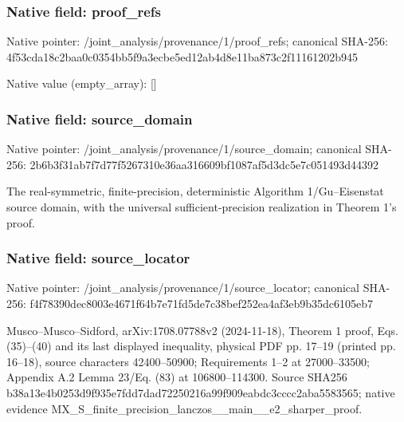 \documentclass[10pt,a4paper]{article}
\begin{document}
\subsubsection{Native field: proof\_\allowbreak{}refs}
Native pointer: /joint\_\allowbreak{}analysis/provenance/1/proof\_\allowbreak{}refs; canonical SHA-256: 4f53cda18c2baa0c0354bb5f9a3ecbe5ed12ab4d8e11ba873c2f11161202b945

Native value (empty\_\allowbreak{}array): []

\subsubsection{Native field: source\_\allowbreak{}domain}
Native pointer: /joint\_\allowbreak{}analysis/provenance/1/source\_\allowbreak{}domain; canonical SHA-256: 2b6b3f31ab7f7d77f5267310e36aa316609bf1087af5d3dc5e7c051493d44392

\begingroup\raggedright\sloppy The real-symmetric,\allowbreak{} finite-precision,\allowbreak{} deterministic Algorithm 1/\allowbreak{}Gu{\AtlasUnicodeText –}\allowbreak{}Eisenstat source domain,\allowbreak{} with the universal sufficient-precision realization in Theorem 1's proof.\par\endgroup

\subsubsection{Native field: source\_\allowbreak{}locator}
Native pointer: /joint\_\allowbreak{}analysis/provenance/1/source\_\allowbreak{}locator; canonical SHA-256: f4f78390dec8003e4671f64b7e71fd5de7c38bef252ea4af3eb9b35dc6105eb7

\begingroup\raggedright\sloppy Musco{\AtlasUnicodeText –}\allowbreak{}Musco{\AtlasUnicodeText –}\allowbreak{}Sidford,\allowbreak{} arXiv:\allowbreak{}1708.07788v2 (2024-11-18),\allowbreak{} Theorem 1 proof,\allowbreak{} Eqs. (35){\AtlasUnicodeText –}\allowbreak{}(40) and its last displayed inequality,\allowbreak{} physical PDF pp. 17{\AtlasUnicodeText –}\allowbreak{}19 (printed pp. 16{\AtlasUnicodeText –}\allowbreak{}18),\allowbreak{} source characters 42400{\AtlasUnicodeText –}\allowbreak{}50900;\allowbreak{} Requirements 1{\AtlasUnicodeText –}\allowbreak{}2 at 27000{\AtlasUnicodeText –}\allowbreak{}33500;\allowbreak{} Appendix A.2 Lemma 23/\allowbreak{}Eq. (83) at 106800{\AtlasUnicodeText –}\allowbreak{}114300. Source SHA256 b38a13e4b0253d9f935e7fdd7dad72250216a99f909eabdc3cccc2aba5583565;\allowbreak{} native evidence MX\_\allowbreak{}S\_\allowbreak{}finite\_\allowbreak{}precision\_\allowbreak{}lanczos\_\allowbreak{}\_\allowbreak{}main\_\allowbreak{}\_\allowbreak{}e2\_\allowbreak{}sharper\_\allowbreak{}proof.\par\endgroup
\end{document}
